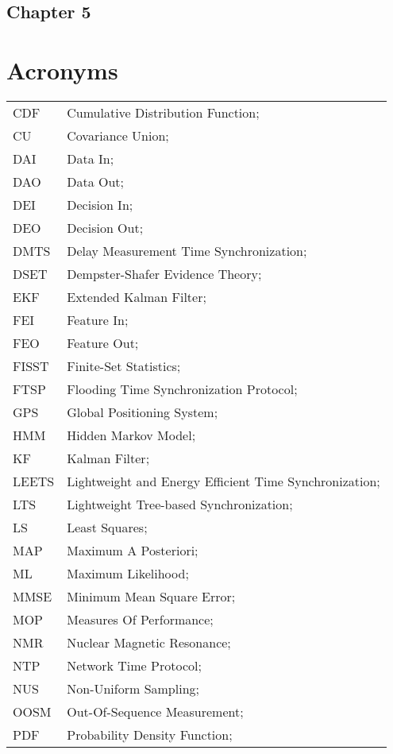 \subsection*{Chapter 5}

\newpage
\section*{Acronyms}
\begin{longtable}{ll}
	CDF			& Cumulative Distribution Function; \\
	CU			& Covariance Union; \\
	DAI			& Data In; \\
	DAO			& Data Out; \\
	DEI			& Decision In; \\
	DEO 		& Decision Out; \\
	DMTS		& Delay Measurement Time Synchronization; \\
	DSET 		& Dempster-Shafer Evidence Theory; \\		
	EKF			& Extended Kalman Filter; \\
	FEI			& Feature In; \\
	FEO			& Feature Out; \\
	FISST		& Finite-Set Statistics; \\
	FTSP		& Flooding Time Synchronization Protocol; \\
	GPS			& Global Positioning System; \\
	HMM			& Hidden Markov Model; \\
	KF 			& Kalman Filter; \\
	LEETS		& Lightweight and Energy Efficient Time Synchronization; \\
	LTS			& Lightweight Tree-based Synchronization; \\
	LS			& Least Squares; \\
	MAP			& Maximum A Posteriori; \\
	ML			& Maximum Likelihood; \\
	MMSE		& Minimum Mean Square Error; \\
	MOP 		& Measures Of Performance; \\
	NMR 		& Nuclear Magnetic Resonance; \\
	NTP			& Network Time Protocol; \\
	NUS 		& Non-Uniform Sampling; \\ 
	OOSM 		& Out-Of-Sequence Measurement; \\
	PDF         & Probability Density Function; \\

\end{longtable}
